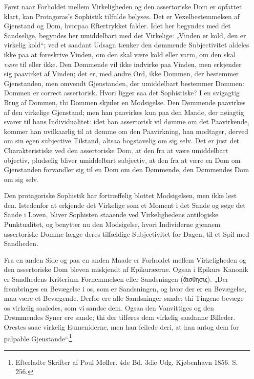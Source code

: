 \documentclass[12pt]{book}
\newcommand{\opage}[1]{\marginnote{\footnotesize\textit{[#1]}}}
\begin{document}
Først naar Forholdet mellem Virkeligheden og den
asser\opage{185}toriske Dom er opfattet klart, kan Protagoras's Sophistik
tilfulde belyses. Det er Vexelbestemmelsen af Gjenstand og
Dom, hvorpaa Eftertrykket falder. Idet her begyndes med
det Sandselige, begyndes her umiddelbart med det Virkelige:
„Vinden er kold, den er virkelig kold“; ved et saadant Udsagn
tænker den dømmende Subjectivitet aldeles ikke paa at
foreskrive Vinden, om den skal være kold eller varm, om den
skal \emph{være} til eller ikke. Den Dømmende vil ikke indvirke paa
Vinden, men erkjender sig paavirket af Vinden; det er, med
andre Ord, ikke Dommen, der bestemmer Gjenstanden, men
omvendt Gjenstanden, der umiddelbart bestemmer Dommen:
Dommen er correct assertorisk. Hvori ligger saa det Sophistiske?
I en svigagtig Brug af Dommen, thi Dommen
skjuler en Modsigelse. Den Dømmende paavirkes af den
virkelige Gjenstand; men han paavirkes kun paa den Maade,
der nøiagtig svarer til hans Individualitet: idet han assertorisk
vil dømme om det Paavirkende, kommer han uvilkaarlig
til at dømme om den Paavirkning, han modtager, derved om
sin egen subjective Tilstand, altsaa bogstavelig om sig selv.
Det er just det Charakteristiske ved den assertoriske Dom, at
den fra at være umiddelbart objectiv, pludselig bliver umiddelbart
subjectiv, at den fra at være en Dom om Gjenstanden
forvandler sig til en Dom om den Dømmende, den Dømmendes
Dom om sig selv.

Den protagoriske Sophistik har fortræffelig blottet Modsigelsen,
men ikke løst den. Istedenfor at erkjende det Virkelige
som et Moment i det Sande og søge det Sande i
Loven, bliver Sophisten staaende ved Virkelighedens antilogiske
Punktualitet, og benytter nu den Modsigelse, hvori Individerne
gjennem assertoriske Domme lægge deres tilfældige Subjectivitet
for Dagen, til et Spil med Sandheden.

Fra en anden Side og paa en anden Maade er Forholdet
mellem Virkeligheden og den assertoriske Dom bleven
miskjendt af Epikuræerne. Ogsaa i Epikurs Kanonik er
\opage{186}Sandhedens Kriterium Fornemmelsen eller Sandsningen
(ἄισθησις).
„Der frembringes en Bevægelse i os, som er
Sandsningen, og hvor der er en Bevægelse, maa være et
Bevægende. Derfor ere alle Sandsninger sande; thi Tingene
bevæge os virkelig saaledes, som vi sandse dem. Ogsaa den
Vanvittiges og den Drømmendes Syner ere sande; thi der
tilføres dem virkelig saadanne Billeder. Orestes saae virkelig
Eumeniderne, men han feilede deri, at han antog dem for
palpable Gjenstande“.\footnote{Efterladte Skrifter af Poul Møller. 4de Bd. 3die Udg. Kjøbenhavn 1856. S. 256.} %
\end{document}

